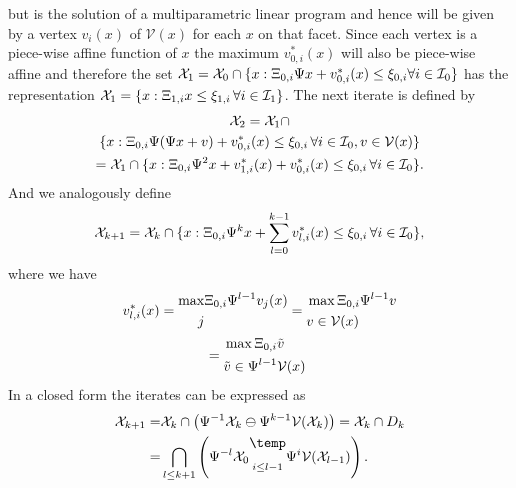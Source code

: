 \documentclass[letterpaper, 10pt, conference]{ieeeconf} %
\newcommand{\bigominus}{\raisebox{10pt}{$\temp$}}
\begin{document}
but is the solution of a multiparametric linear program and hence will be given 
by a vertex $v_i(x)$ of $\mathcal V(x)$ for each $x$ on that facet.
Since each vertex is a piece-wise affine function of $x$ the maximum $v_{0,i}^\ast(x)$ will also
be piece-wise affine
and therefore the set $\mathcal X_1=\mathcal X_0 \cap \{x:\Xi_{0,i}\Psi x + v_{0,i}^\ast(x) \leq 
\xi_{0,i}\forall i\in\mathcal I_0\}$
has the representation $\mathcal X_1 = \{x:\Xi_{1,i}x\leq\xi_{1,i}\,\forall i\in\mathcal I_1\}$.
The next iterate is defined by
%
\begin{multline}
	\mathcal X_2 = \mathcal X_1 \cap \\ \{x:\Xi_{0,i}\Psi(\Psi x + v) + v_{0,i}^\ast(x)\leq\xi_{0,i}\,
	\forall i\in\mathcal I_0,v\in\mathcal V(x)\}\\
	= \mathcal X_1 \cap \{x: \Xi_{0,i}\Psi^2 x + v_{1,i}^\ast(x) + v_{0,i}^\ast(x)\leq\xi_{0,i}\,\forall 
	i\in\mathcal I_0\}.
\end{multline}
%
And we analogously define
%
\begin{equation}
	\mathcal X_{k+1} = \mathcal X_k\cap \{x:\Xi_{0,i}\Psi^k x + \sum_{l=0}^{k-1}v_{l,i}^\ast(x)
	\leq\xi_{0,i}\,\forall i\in\mathcal I_0\},
\end{equation}
%
where we have 
%
\begin{multline}
	v_{l,i}^\ast(x)=\begin{split}\max& \genmat_{0,i}\Psi^{l-1}v_j(x)\\ j&\end{split}
	 = \begin{split}&\max \genmat_{0,i}\Psi^{l-1}v \\ &v\in\mathcal V(x)\end{split}\\
	= \begin{split}&\max \genmat_{0,i}\tilde v\\ &\tilde v\in \Psi^{l-1}\mathcal V(x) \end{split}
\end{multline}
%
In a closed form the iterates can be expressed as
%
\begin{equation}\label{eq:set:iteration:state:dependent:constraints}
\begin{split}
	\mathcal X_{k+1} =& \mathcal X_k\cap\left(\Psi^{-1}\mathcal X_k \ominus \Psi^{k-1}\mathcal V(\mathcal X_k)\right)
	=\mathcal X_k\cap D_k \\
	=& \bigcap_{l\leq k+1}\left( \Psi^{-l} \mathcal X_0 \underset{i\leq l-1}{\bigominus} \Psi^i \mathcal V(\mathcal X_{l-1})\right).
\end{split}\end{equation}
\end{document}
